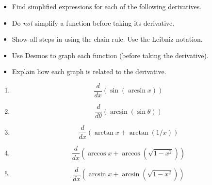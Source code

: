 \documentclass{ximera}
\begin{document}
\begin{exercise}  \label{Ehglkhfgjsdafn}
\begin{itemize}
\item Find simplified expressions for each of the following derivatives. 

\item Do \emph{not} simplify a function before taking its derivative. 

\item Show all steps in using the chain rule. Use the Leibniz notation. 

\item Use Desmos to graph each function (before taking the derivative).

\item Explain how each graph is related to the derivative. 

\end{itemize}

\begin{enumerate}
\item
\[
       \frac{d}{dx}\left( \sin(\arcsin x ) \right)
\]

\item 
\[
       \frac{d}{d\theta}\left( \arcsin(\sin \theta ) \right)
\]

\item 
\[
  \frac{d}{dx}\left( \arctan x + \arctan(1/x)  \right)
\]

\item
\[
    \frac{d}{dx}\left( \arccos x + \arccos\left(\sqrt{1-x^2}\right)  \right)
\] 

\item
\[
    \frac{d}{dx}\left( \arcsin x + \arcsin\left(\sqrt{1-x^2}\right)  \right)
\] 
\end{enumerate}

\end{exercise}
\end{document}
